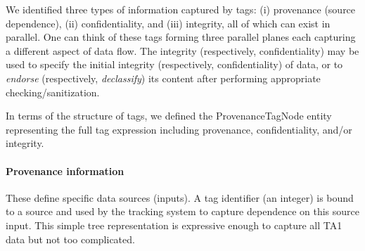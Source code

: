 \documentclass[10pt, conference, onecolumn]{IEEEtran}
\begin{document}
We identified three types of information captured by tags: (i) provenance (source dependence), (ii) confidentiality, and (iii) integrity, all of which can exist in parallel.
One can think of these tags forming three parallel planes each capturing a different aspect of data flow.
The integrity (respectively, confidentiality) may be used to specify the initial integrity (respectively, confidentiality) of data, 
or to {\em endorse} (respectively, {\em declassify}) its content after performing appropriate checking/sanitization.

In terms of the structure of tags, we defined the ProvenanceTagNode entity representing the full tag expression 
including provenance, confidentiality, and/or integrity.

\paragraph{Provenance information}
These define specific data sources (inputs). A tag identifier (an integer) is bound to a 
source and used by the tracking system to capture dependence on this source input.
This simple tree representation is expressive enough to capture all TA1 data but not too complicated.
\end{document}
